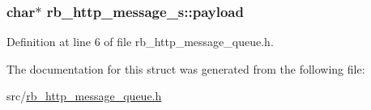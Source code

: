 \subsubsection[{payload}]{\setlength{\rightskip}{0pt plus 5cm}char$\ast$ rb\+\_\+http\+\_\+message\+\_\+s\+::payload}\label{structrb__http__message__s_a70cd28f794d09eb47cf19a37fb7ba42b}


Definition at line 6 of file rb\+\_\+http\+\_\+message\+\_\+queue.\+h.



The documentation for this struct was generated from the following file\+:\begin{DoxyCompactItemize}
\item 
src/\hyperlink{rb__http__message__queue_8h}{rb\+\_\+http\+\_\+message\+\_\+queue.\+h}\end{DoxyCompactItemize}
